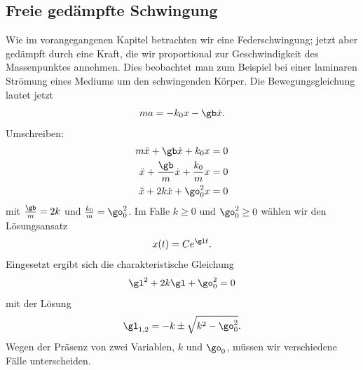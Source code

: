 \documentclass[%
draft,
11pt,%
twoside,%
titlepage,%
german,%
headsepline%
]{scrartcl}
\begin{document}
\subsection{Freie ged\"ampfte Schwingung}

Wie im vorangegangenen Kapitel betrachten wir eine Federschwingung; jetzt aber
ged\"ampft durch eine Kraft, die wir proportional zur Geschwindigkeit des Massenpunktes annehmen. Dies beobachtet man zum Beispiel bei einer laminaren Str\"omung eines Mediums um den schwingenden K\"orper. Die Bewegungsgleichung lautet jetzt
$$ma=-k_0x-\gb \dot{x}.$$
Umschreiben:
\begin{align*}
m\ddot{x}+\gb \dot{x}+k_0x &=0\\
\ddot{x} +\frac{\gb}{m}\dot{x}+\frac{k_0}{m}x&=0\\
\ddot{x}+2k\dot{x}+\go_0^2 x &=0
\end{align*}
mit $\frac{\gb}{m}=2k$ und $\frac{k_0}{m}=\go_0^2$.
Im Falle $k\geq0$ und $\go_0^2\geq0$ w\"ahlen wir den L\"osungsansatz
$$x(t)=Ce^{\gl t}.$$
Eingesetzt ergibt sich die charakteristische Gleichung
$$\gl^2+2k\gl+\go_0^2=0$$
mit der L\"osung
$$\gl_{1,2}=-k\pm\sqrt{k^2-\go_0^2}.$$
Wegen der Pr\"asenz von zwei Variablen, $k$ und $\go_0$, m\"ussen wir verschiedene F\"alle unterscheiden.
\end{document}
